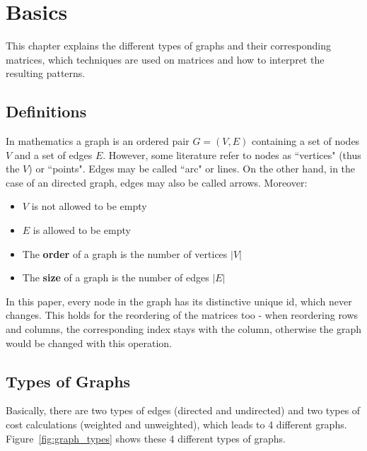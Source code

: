 %
%
% 
% 
% 


\chapter{Basics}\label{chap:Basics}


This chapter explains the different types of graphs and their corresponding matrices, which techniques are used on matrices and how to interpret the resulting patterns.

\section{Definitions}
In mathematics a graph is an ordered pair $G = (V, E)$ containing a set of nodes $V$ and a set of edges $E$. However, some literature refer to nodes as ``vertices" (thus the $V$) or ``points".
Edges may be called ``arc" or lines. 
On the other hand, in the case of an directed graph, edges may also be called arrows. Moreover: \begin{itemize}
	\item $V$ is not allowed to be empty
	\item $E$ is allowed to be empty
	\item The \textbf{order} of a graph is the number of vertices $|V|$
	\item The \textbf{size} of a graph is the number of edges $|E|$
\end{itemize}

In this paper, every node in the graph has its distinctive unique id, which never changes. This holds for the reordering of the matrices too - when reordering rows and columns, the corresponding index stays with the column, otherwise the graph would be changed with this operation.


\section{Types of Graphs}

Basically, there are two types of edges (directed and undirected) and two types of cost calculations (weighted and unweighted), which leads to 4 different graphs. Figure~\ref{fig:graph_types} shows these 4 different types of graphs. 


